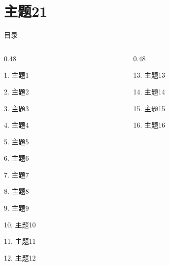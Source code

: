 \documentclass[aspectratio=169,10pt,fontset=fandol]{ctexbeamer}
\begin{document}
\section{主题21}
\begin{frame}[t,fragile]{目录}
\small
\begin{columns}[T,onlytextwidth]
\begin{column}{0.48\textwidth}
{\color{black}\small 1. 主题1\par}\vspace{0.22em}
{\color{black}\small 2. 主题2\par}\vspace{0.22em}
{\color{black}\small 3. 主题3\par}\vspace{0.22em}
{\color{black}\small 4. 主题4\par}\vspace{0.22em}
{\color{black}\small 5. 主题5\par}\vspace{0.22em}
{\color{black}\small 6. 主题6\par}\vspace{0.22em}
{\color{black}\small 7. 主题7\par}\vspace{0.22em}
{\color{black}\small 8. 主题8\par}\vspace{0.22em}
{\color{black}\small 9. 主题9\par}\vspace{0.22em}
{\color{black}\small 10. 主题10\par}\vspace{0.22em}
{\color{black}\small 11. 主题11\par}\vspace{0.22em}
{\color{black}\small 12. 主题12\par}\vspace{0.22em}
\end{column}
\begin{column}{0.48\textwidth}
{\color{black}\small 13. 主题13\par}\vspace{0.22em}
{\color{black}\small 14. 主题14\par}\vspace{0.22em}
{\color{black}\small 15. 主题15\par}\vspace{0.22em}
{\color{black}\small 16. 主题16\par}\vspace{0.22em}

\end{column}
\end{columns}
\end{frame}
\end{document}
